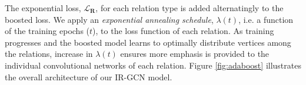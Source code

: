 The exponential loss, $\mathcal{L}_{\mathbf{R}}$, for each relation type is added alternatingly to the boosted loss.
We apply an \emph{exponential annealing schedule}, $\lambda(t)$, i.e. a function of the training epochs ($t$), to the loss function of each relation. As training progresses and the boosted model learns to optimally distribute vertices among the relations, increase in $\lambda(t)$ ensures more emphasis is provided to the individual convolutional networks of each relation. Figure \ref{fig:adaboost} illustrates the overall architecture of our IR-GCN model.
